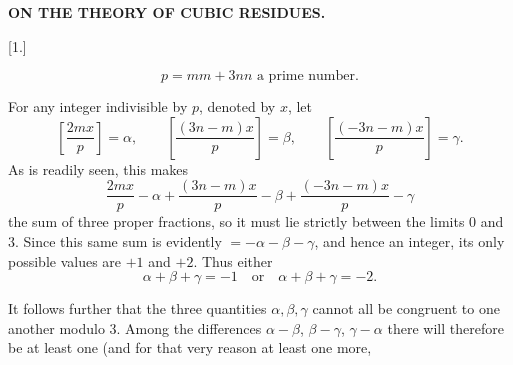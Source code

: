 \clearpage{}
\begin{center}
\bfseries ON THE THEORY OF CUBIC RESIDUES.
\end{center}



\begin{center}
[1.]
\end{center}

\[ p=mm+3nn \text{ a prime number.} \]

\noindent\hspace*{\parindent}For any integer indivisible by $p$, denoted by $x$, let
\[
\left[\dfrac{2mx}{p}\right]=\alpha,\qquad \left[\dfrac{(3n-m)x}{p}\right]=\beta,\qquad \left[\dfrac{(-3n-m)x}{p}\right]=\gamma.
\]
\noindent As is readily seen, this makes
\[
\dfrac{2mx}{p}-\alpha+\dfrac{(3n-m)x}{p}-\beta+\dfrac{(-3n-m)x}{p}-\gamma
\]
the sum of three proper fractions, so it must lie strictly between the limits
0 and 3. Since this same sum is evidently $=-\alpha-\beta-\gamma$, and hence an integer,
its only possible values are $+1$ and $+2$.
Thus either
\[ \alpha+\beta+\gamma=-1\quad\text{or}\quad \alpha+\beta+\gamma=-2. \]

\noindent It follows further that the three quantities $\alpha, \beta, \gamma$ cannot all be congruent
to one another modulo 3. Among the differences $\alpha-\beta$, $\beta-\gamma$,
$\gamma-\alpha$ there will therefore be at least one (and for that very reason at least one more,
